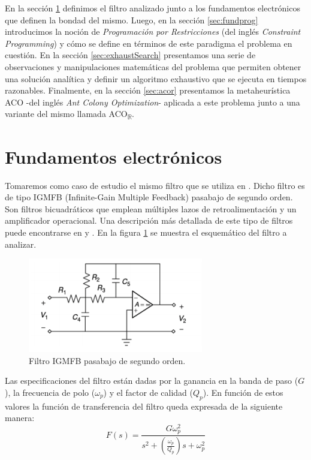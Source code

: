 \documentclass{llncs}
\begin{document}
    En la sección \ref{sec:fundelect} definimos el filtro analizado
    junto a los fundamentos electrónicos que definen la bondad del mismo. Luego, en la
    sección \ref{sec:fundprog} introducimos la noción de \textit{Programación por Restricciones} 
    (del inglés \textit{Constraint Programming})
    y cómo se define en términos de este paradigma el problema en cuestión. En la sección
    \ref{sec:exhaustSearch} presentamos una serie de observaciones y manipulaciones matemáticas 
    del problema que permiten obtener una solución analítica y definir un algoritmo exhaustivo que se ejecuta
    en tiempos razonables. Finalmente, en la sección \ref{sec:acor} presentamos la metaheurística ACO
    -del inglés \textit{Ant Colony Optimization}- aplicada a este problema junto a una variante 
    del mismo llamada ACO\textsubscript{$\mathbb{R}$}.
    
  \section{\textbf{Fundamentos electrónicos}}
    \label{sec:fundelect}
    Tomaremos como caso de estudio el mismo filtro que se utiliza en \cite{lov:rom:per}. Dicho filtro
    es de tipo IGMFB (Infinite-Gain Multiple Feedback) pasabajo de segundo orden. Son filtros
    bicuadráticos que emplean múltiples lazos de retroalimentación y un amplificador operacional.
    Una descripción más detallada de este tipo de filtros puede encontrarse en \cite{dim} y \cite{rau:swa}. 
    En la figura \ref{fig:filter} se muestra el esquemático del filtro a analizar.
   
   \begin{figure}
   	\centering
   	\includegraphics[scale=0.65]{filter.png}
   	\caption{Filtro IGMFB pasabajo de segundo orden.}
   	\label{fig:filter}
   \end{figure}

	Las especificaciones del filtro están dadas por la ganancia en la banda de paso ($G$), la
	frecuencia de polo ($\omega_p$) y el factor de calidad ($Q_p$). En función de estos valores
	la función de transferencia del filtro queda expresada de la siguiente manera:
 	\begin{equation}
		F(s) = \frac{G\omega_p^2}{s^2+(\frac{\omega_p}{Q_p})s+\omega_p^2}
		\label{funcTransfer}
	\end{equation}
	
\end{document}
